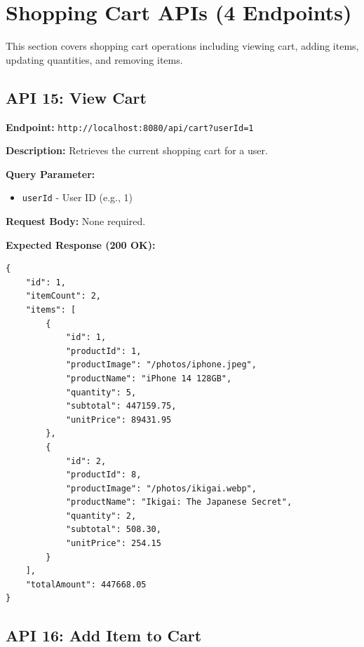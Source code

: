 \documentclass[12pt, a4paper]{article}
\begin{document}
\section{Shopping Cart APIs (4 Endpoints)}

This section covers shopping cart operations including viewing cart, adding items, updating quantities, and removing items.

\subsection{API 15: View Cart}

\begin{tcolorbox}[colback=getcolor!10, colframe=getcolor, title=GET]
\textbf{Endpoint:} \texttt{http://localhost:8080/api/cart?userId=1}
\end{tcolorbox}

\textbf{Description:} Retrieves the current shopping cart for a user.

\textbf{Query Parameter:}
\begin{itemize}
    \item \texttt{userId} - User ID (e.g., 1)
\end{itemize}

\textbf{Request Body:} None required.

\textbf{Expected Response (200 OK):}
\begin{lstlisting}
{
    "id": 1,
    "itemCount": 2,
    "items": [
        {
            "id": 1,
            "productId": 1,
            "productImage": "/photos/iphone.jpeg",
            "productName": "iPhone 14 128GB",
            "quantity": 5,
            "subtotal": 447159.75,
            "unitPrice": 89431.95
        },
        {
            "id": 2,
            "productId": 8,
            "productImage": "/photos/ikigai.webp",
            "productName": "Ikigai: The Japanese Secret",
            "quantity": 2,
            "subtotal": 508.30,
            "unitPrice": 254.15
        }
    ],
    "totalAmount": 447668.05
}
\end{lstlisting}

\vspace{0.5cm}

\subsection{API 16: Add Item to Cart}
\end{document}
